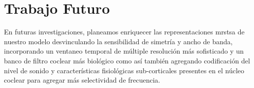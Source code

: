 

\section{Trabajo Futuro}

En futuras investigaciones, planeamos enriquecer las representaciones \gls{mrstsa} de nuestro modelo  desvinculando la sensibilidad de simetría y ancho de banda, incorporando un ventaneo temporal de múltiple resolución más sofisticado y un banco de filtro coclear más biológico como así también agregando codificación del nivel de sonido y características fisiológicas sub-corticales presentes en el núcleo coclear para agregar más selectividad de frecuencia. 


